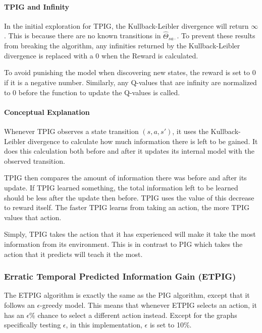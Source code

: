 \documentclass[letterpaper]{article} %
\begin{document}
\paragraph{TPIG and Infinity}
In the initial exploration for TPIG, the Kullback-Leibler divergence will return $\infty$. This is because there are no known transitions in $\hat{\Theta}_{sa\cdot}$. To prevent these results from breaking the algorithm, any infinities returned by the Kullback-Leibler divergence is replaced with a 0 when the Reward is calculated.

To avoid punishing the model when discovering new states, the reward is set to 0 if it is a negative number. Similarly, any Q-values that are infinity are normalized to 0 before the function to update the Q-values is called.

\paragraph{Conceptual Explanation}
Whenever TPIG observes a state transition $(s,a,s')$, it uses the Kullback-Leibler divergence to calculate how much information there is left to be gained. It does this calculation both before and after it updates its internal model with the observed transition.

TPIG then compares the amount of information there was before and after its update. If TPIG learned something, the total information left to be learned should be less after the update then before. TPIG uses the value of this decrease to reward itself. The faster TPIG learns from taking an action, the more TPIG values that action.

Simply, TPIG takes the action that it has experienced will make it take the most information from its environment. This is in contrast to PIG which takes the action that it predicts will teach it the most.

\subsubsection{Erratic Temporal Predicted Information Gain (ETPIG)}
The ETPIG algorithm is exactly the same as the PIG algorithm, except that it follows an $\epsilon$-greedy model. This means that whenever ETPIG selects an action, it has an $\epsilon$\% chance to select a different action instead. Except for the graphs specifically testing $\epsilon$, in this implementation, $\epsilon$ is set to 10\%.
\end{document}
